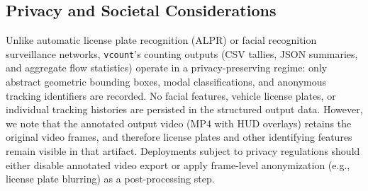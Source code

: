 \subsection{Privacy and Societal Considerations}
Unlike automatic license plate recognition (ALPR) or facial recognition surveillance networks, \texttt{vcount}'s counting outputs (CSV tallies, JSON summaries, and aggregate flow statistics) operate in a privacy-preserving regime: only abstract geometric bounding boxes, modal classifications, and anonymous tracking identifiers are recorded. No facial features, vehicle license plates, or individual tracking histories are persisted in the structured output data. However, we note that the annotated output video (MP4 with HUD overlays) retains the original video frames, and therefore license plates and other identifying features remain visible in that artifact. Deployments subject to privacy regulations should either disable annotated video export or apply frame-level anonymization (e.g., license plate blurring) as a post-processing step.

